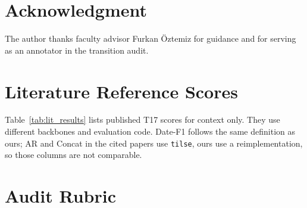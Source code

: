 \documentclass[journal]{IEEEtran}
\begin{document}
\section*{Acknowledgment}
The author thanks faculty advisor Furkan \"{O}ztemiz for guidance and for serving as an annotator in the transition audit.

\appendices
\section{Literature Reference Scores}
\label{app:legacy}

Table~\ref{tab:lit_results} lists published T17 scores for context only. They use different backbones and evaluation code. Date-F1 follows the same definition as ours; AR and Concat in the cited papers use \texttt{tilse}, ours use a reimplementation, so those columns are not comparable.

\begin{table}[h]
\centering
\caption{Published literature scores on \textbf{T17} (contextual only).}
\label{tab:lit_results}
\renewcommand{\arraystretch}{1.12}
\end{table}

\section{Audit Rubric}
\label{app:rubric}
\end{document}
